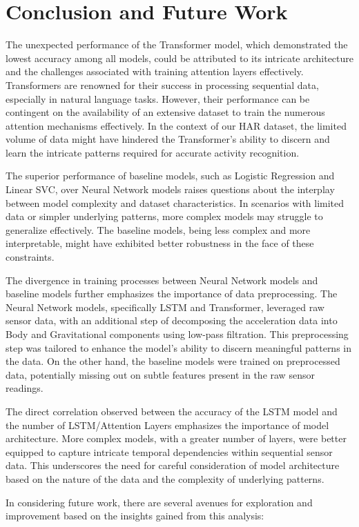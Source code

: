 \documentclass[conference]{IEEEtran}
\begin{document}
\section{Conclusion and Future Work}
The unexpected performance of the Transformer model, which demonstrated the lowest accuracy among all models, could be attributed to its intricate architecture and the challenges associated with training attention layers effectively. Transformers are renowned for their success in processing sequential data, especially in natural language tasks. However, their performance can be contingent on the availability of an extensive dataset to train the numerous attention mechanisms effectively. In the context of our HAR dataset, the limited volume of data might have hindered the Transformer's ability to discern and learn the intricate patterns required for accurate activity recognition.

The superior performance of baseline models, such as Logistic Regression and Linear SVC, over Neural Network models raises questions about the interplay between model complexity and dataset characteristics. In scenarios with limited data or simpler underlying patterns, more complex models may struggle to generalize effectively. The baseline models, being less complex and more interpretable, might have exhibited better robustness in the face of these constraints.

The divergence in training processes between Neural Network models and baseline models further emphasizes the importance of data preprocessing. The Neural Network models, specifically LSTM and Transformer, leveraged raw sensor data, with an additional step of decomposing the acceleration data into Body and Gravitational components using low-pass filtration. This preprocessing step was tailored to enhance the model's ability to discern meaningful patterns in the data. On the other hand, the baseline models were trained on preprocessed data, potentially missing out on subtle features present in the raw sensor readings.

The direct correlation observed between the accuracy of the LSTM model and the number of LSTM/Attention Layers emphasizes the importance of model architecture. More complex models, with a greater number of layers, were better equipped to capture intricate temporal dependencies within sequential sensor data. This underscores the need for careful consideration of model architecture based on the nature of the data and the complexity of underlying patterns.

In considering future work, there are several avenues for exploration and improvement based on the insights gained from this analysis:
\end{document}
